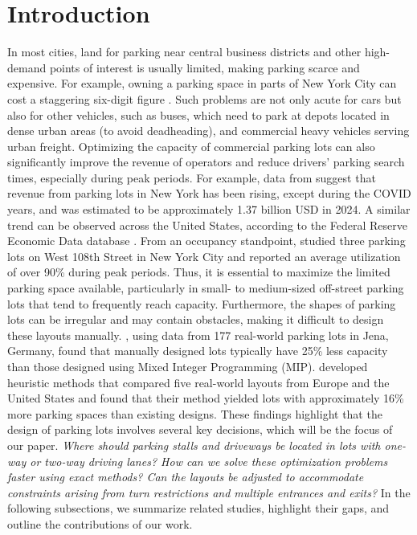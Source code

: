\documentclass[10pt]{article}
\theoremstyle{definition}
\begin{document}
\section{Introduction}
In most cities, land for parking near central business districts and other high-demand points of interest is usually limited, making parking scarce and expensive. For example, owning a parking space in parts of New York City can cost a staggering six-digit figure \citep{nytimes2007, nytimes2019}. Such problems are not only acute for cars but also for other vehicles, such as buses, which need to park at depots located in dense urban areas (to avoid deadheading), and commercial heavy vehicles serving urban freight. Optimizing the capacity of commercial parking lots can also significantly improve the revenue of operators and reduce drivers' parking search times, especially during peak periods. For example, data from \cite{statista_parking_revenue_us} suggest that revenue from parking lots in New York has been rising, except during the COVID years, and was estimated to be approximately 1.37 billion USD in 2024. A similar trend can be observed across the United States, according to the Federal Reserve Economic Data database \citep{fred_parking_revenue}. From an occupancy standpoint, \cite{nelsonnygaard108th} studied three parking lots on West 108th Street in New York City and reported an average utilization of over 90\% during peak periods. Thus, it is essential to maximize the limited parking space available, particularly in small- to medium-sized off-street parking lots that tend to frequently reach capacity. Furthermore, the shapes of parking lots can be irregular and may contain obstacles, making it difficult to design these layouts manually. \cite{stephan2021layout}, using data from 177 real-world parking lots in Jena, Germany, found that manually designed lots typically have 25\% less capacity than those designed using Mixed Integer Programming (MIP). \cite{cudzik2024} developed heuristic methods that compared five real-world layouts from Europe and the United States and found that their method yielded lots with approximately 16\% more parking spaces than existing designs. These findings highlight that the design of parking lots involves several key decisions, which will be the focus of our paper. \textit{Where should parking stalls and driveways be located in lots with one-way or two-way driving lanes? How can we solve these optimization problems faster using exact methods? Can the layouts be adjusted to accommodate constraints arising from turn restrictions and multiple entrances and exits?} In the following subsections, we summarize related studies, highlight their gaps, and outline the contributions of our work.
\end{document}
